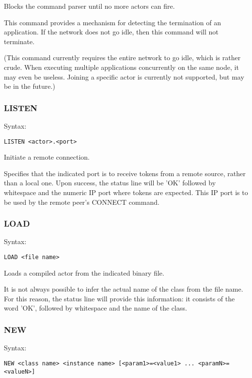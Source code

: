 \documentclass[10pt, a4paper]{article}
\begin{document}
Blocks the command parser until no more actors can fire.

This command provides a mechanism for detecting the termination of an application. If the network does not go idle, then this command will not terminate.

(This command currently requires the entire network to go idle, which is rather crude. When executing multiple applications concurrently on the same node, it may even be useless. Joining a specific actor is currently not supported, but may be in the future.)

\subsubsection*{LISTEN}

Syntax:
\begin{verbatim}
LISTEN <actor>.<port>
\end{verbatim}

Initiate a remote connection.

Specifies that the indicated port is to receive tokens from a remote source, rather than a local one. Upon success, the status line will be 'OK' followed by whitespace and the numeric IP port where tokens are expected. This IP port is to be used by the remote peer's CONNECT command.

\subsubsection*{LOAD}

Syntax:
\begin{verbatim}
LOAD <file name>
\end{verbatim}

Loads a compiled actor from the indicated binary file.

It is not always possible to infer the actual name of the class from the file name. For this reason, the status line will provide this information: it consists of the word 'OK', followed by whitespace and the name of the class.

\subsubsection*{NEW}

Syntax:
\begin{verbatim}
NEW <class name> <instance name> [<param1>=<value1> ... <paramN>=<valueN>]
\end{verbatim}
\end{document}
